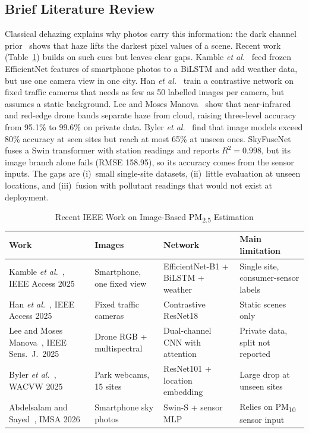 \documentclass[conference]{IEEEtran}
\newcommand{\pmtwofive}{PM\textsubscript{2.5}}
\begin{document}
\subsection{Brief Literature Review}
Classical dehazing explains why photos carry this information: the dark channel prior~\cite{he2011} shows that haze lifts the darkest pixel values of a scene. Recent work (Table~\ref{tab:lit}) builds on such cues but leaves clear gaps. Kamble \textit{et al.}~\cite{kamble2025} feed frozen EfficientNet features of smartphone photos to a BiLSTM and add weather data, but use one camera view in one city. Han \textit{et al.}~\cite{han2025} train a contrastive network on fixed traffic cameras that needs as few as 50 labelled images per camera, but assumes a static background. Lee and Moses Manova~\cite{lee2025} show that near-infrared and red-edge drone bands separate haze from cloud, raising three-level accuracy from 95.1\% to 99.6\% on private data. Byler \textit{et al.}~\cite{byler2025} find that image models exceed 80\% accuracy at seen sites but reach at most 65\% at unseen ones. SkyFuseNet~\cite{abdelsalam2026} fuses a Swin transformer with station readings and reports $R^2=0.998$, but its image branch alone fails (RMSE 158.95), so its accuracy comes from the sensor inputs. The gaps are (i)~small single-site datasets, (ii)~little evaluation at unseen locations, and (iii)~fusion with pollutant readings that would not exist at deployment.

\begin{table}[htbp]
\centering
\caption{Recent IEEE Work on Image-Based \pmtwofive{} Estimation}
\label{tab:lit}
\begin{tabular}{p{3.9cm}p{3.4cm}p{4.3cm}p{4.3cm}}
\toprule
Work & Images & Network & Main limitation \\
\midrule
Kamble \textit{et al.}~\cite{kamble2025}, IEEE Access 2025 & Smartphone, one fixed view & EfficientNet-B1 + BiLSTM + weather & Single site, consumer-sensor labels \\
Han \textit{et al.}~\cite{han2025}, IEEE Access 2025 & Fixed traffic cameras & Contrastive ResNet18 & Static scenes only \\
Lee and Moses Manova~\cite{lee2025}, IEEE Sens.\ J.\ 2025 & Drone RGB + multispectral & Dual-channel CNN with attention & Private data, split not reported \\
Byler \textit{et al.}~\cite{byler2025}, WACVW 2025 & Park webcams, 15 sites & ResNet101 + location embedding & Large drop at unseen sites \\
Abdelsalam and Sayed~\cite{abdelsalam2026}, IMSA 2026 & Smartphone sky photos & Swin-S + sensor MLP & Relies on PM\textsubscript{10} sensor input \\
\bottomrule
\end{tabular}
\end{table}
\end{document}
